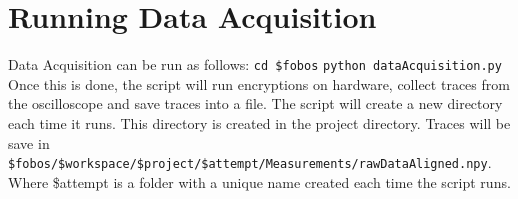 \section{Running Data Acquisition}

Data Acquisition can be run as follows: \newline
\texttt{cd \$fobos} \newline
\texttt{python dataAcquisition.py} \newline
Once this is done, the script will run encryptions on hardware, collect traces from the oscilloscope and save traces into a file.
The script will create a new directory each time it runs. This directory is created in the project directory.
Traces will be save in \newline \texttt{\$fobos/\$workspace/\$project/\$attempt/Measurements/rawDataAligned.npy}.
Where \$attempt is a folder with a unique name created each time the script runs.
